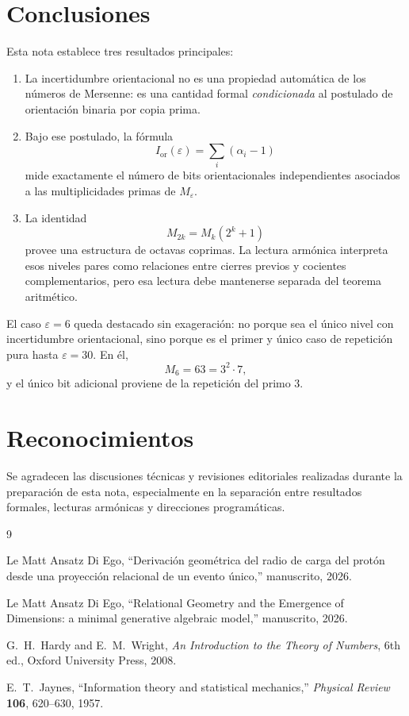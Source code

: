 \documentclass[11pt]{article}
\newcommand{\Ior}{I_{\mathrm{or}}}
\begin{document}
\clearpage
\section{Conclusiones}

Esta nota establece tres resultados principales:

\begin{enumerate}[leftmargin=*]
\item La incertidumbre orientacional no es una propiedad automática de los números de Mersenne: es una cantidad formal \emph{condicionada} al postulado de orientación binaria por copia prima.

\item Bajo ese postulado, la fórmula
\[
\Ior(\varepsilon)=\sum_i(\alpha_i-1)
\]
mide exactamente el número de bits orientacionales independientes asociados a las multiplicidades primas de $M_\varepsilon$.

\item La identidad
\[
M_{2k}=M_k(2^k+1)
\]
provee una estructura de octavas coprimas. La lectura armónica interpreta esos niveles pares como relaciones entre cierres previos y cocientes complementarios, pero esa lectura debe mantenerse separada del teorema aritmético.
\end{enumerate}

El caso $\varepsilon=6$ queda destacado sin exageración: no porque sea el único nivel con incertidumbre orientacional, sino porque es el primer y único caso de repetición pura hasta $\varepsilon=30$. En él,
\[
M_6=63=3^2\cdot7,
\]
y el único bit adicional proviene de la repetición del primo $3$.

\section*{Reconocimientos}

Se agradecen las discusiones técnicas y revisiones editoriales realizadas durante la preparación de esta nota, especialmente en la separación entre resultados formales, lecturas armónicas y direcciones programáticas.

\begin{thebibliography}{9}

Le Matt Ansatz Di Ego,
``Derivación geométrica del radio de carga del protón desde una proyección relacional de un evento único,''
manuscrito, 2026.

Le Matt Ansatz Di Ego,
``Relational Geometry and the Emergence of Dimensions: a minimal generative algebraic model,''
manuscrito, 2026.

G.~H.~Hardy and E.~M.~Wright,
\emph{An Introduction to the Theory of Numbers},
6th ed., Oxford University Press, 2008.

E.~T.~Jaynes,
``Information theory and statistical mechanics,''
\emph{Physical Review} \textbf{106}, 620--630, 1957.

\end{thebibliography}
\end{document}
